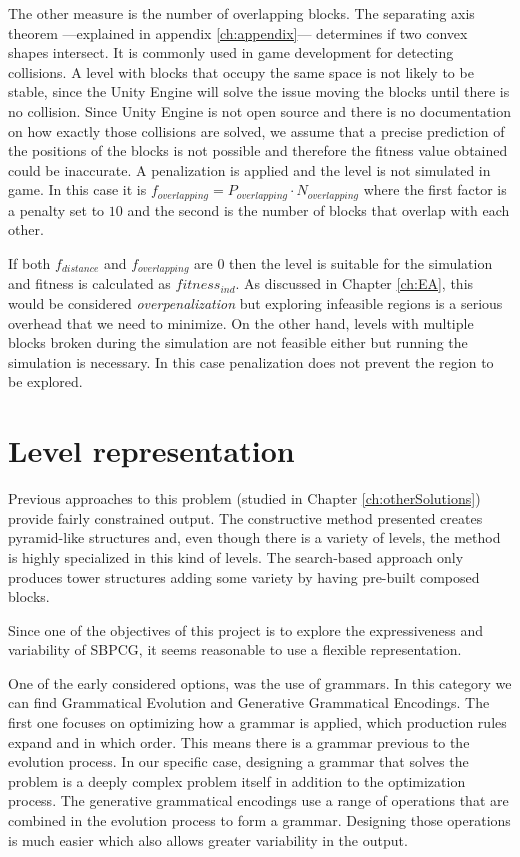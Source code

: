 The other measure is the number of overlapping blocks. The separating axis theorem ---explained in appendix \ref{ch:appendix}--- determines if two convex shapes intersect. It is commonly used in game development for detecting collisions. A level with blocks that occupy the same space is not likely to be stable, since the Unity Engine will solve the issue moving the blocks until there is no collision. Since Unity Engine is not open source and there is no documentation on how exactly those collisions are solved, we assume that a precise prediction of the positions of the blocks is not possible and therefore the fitness value obtained could be inaccurate. A penalization is applied and the level is not simulated in game. In this case it is $f_{overlapping} = P_{overlapping} \cdot N_{overlapping}$ where the first factor is a penalty set to $10$ and the second is the number of  blocks that overlap with each other. 

If both $f_{distance}$ and $f_{overlapping}$ are $0$ then the level is suitable for the simulation and fitness is calculated as $fitness_{ind}$. As discussed in Chapter \ref{ch:EA}, this would be considered \textit{overpenalization} but exploring infeasible regions is a serious overhead that we need to minimize. On the other hand, levels with multiple blocks broken during the simulation are not feasible either but running the simulation is necessary. In this case penalization does not prevent the region to be explored.
\section{Level representation}

Previous approaches to this problem (studied in Chapter \ref{ch:otherSolutions}) provide fairly constrained output. The constructive method presented creates pyramid-like structures and, even though there is a variety of levels, the method is highly specialized in this kind of levels. The search-based approach only produces tower structures adding some variety by having pre-built composed blocks. 

Since one of the objectives of this project is to explore the expressiveness and variability of \acs{SBPCG}, it seems reasonable to use a flexible representation. 

One of the early considered options, was the use of grammars. In this category we can find Grammatical Evolution\cite{lourencco2015sge} and Generative Grammatical Encodings\cite{hornby2001advantages}. The first one focuses on optimizing how a grammar is applied, which production rules expand and in which order. This means there is a grammar previous to the evolution process. In our specific case, designing a grammar that solves the problem is a deeply complex problem itself in addition to the optimization process. The generative grammatical encodings use a range of operations that are combined in the evolution process to form a grammar. Designing those operations is much easier which also allows greater variability in the output. 

